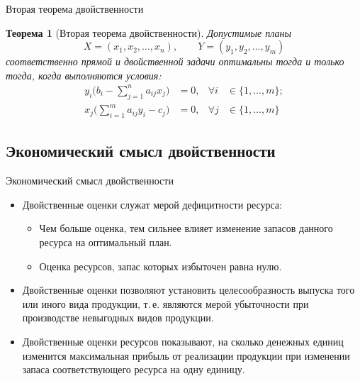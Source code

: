 \documentclass[unicode,11pt,notheorems,xcolor=table]{beamer}
\newtheorem{theorem}{Теорема}
\begin{document}
\begin{frame}{Вторая теорема двойственности}{}
	\begin{theorem}[Вторая теорема двойственности]
		Допустимые планы
		$$
		X = (x_1,x_2,\ldots,x_n),\qquad Y = (y_1,y_2,\ldots,y_m)
		$$
		соответственно прямой и двойственной задачи оптимальны
		тогда и только тогда, когда выполняются условия:
		$$
		\begin{aligned}
		y_i  \Big(b_i -  \sum_{j=1}^{n}a_{ij} x_j \Big) &= 0, & \forall i &\in \{1,\ldots,m\};\\
		x_j  \Big( \sum_{i=1}^{m}a_{ij} y_i - c_j \Big) &= 0, & \forall j &\in \{1,\ldots,m\}
		\end{aligned}
		$$
	\end{theorem}
\end{frame}

\subsection{Экономический смысл двойственности}

\begin{frame}{Экономический смысл двойственности}
\begin{itemize}
\item 
	Двойственные оценки служат мерой дефицитности ресурса:
	\begin{itemize}
	\item 
		Чем больше оценка, тем сильнее влияет изменение запасов данного ресурса на оптимальный план.
	\item 
		Оценка ресурсов, запас которых избыточен равна нулю.
	\end{itemize}
\item 
	Двойственные оценки позволяют установить целесообразность выпуска того или  иного вида продукции, т.\,е. являются мерой убыточности при производстве невыгодных видов продукции.
\item 
    Двойственные оценки ресурсов показывают, на сколько денежных единиц изменится максимальная прибыль от реализации продукции при изменении запаса соответствующего ресурса на одну единицу. 
\end{itemize}

\end{frame}
\end{document}

